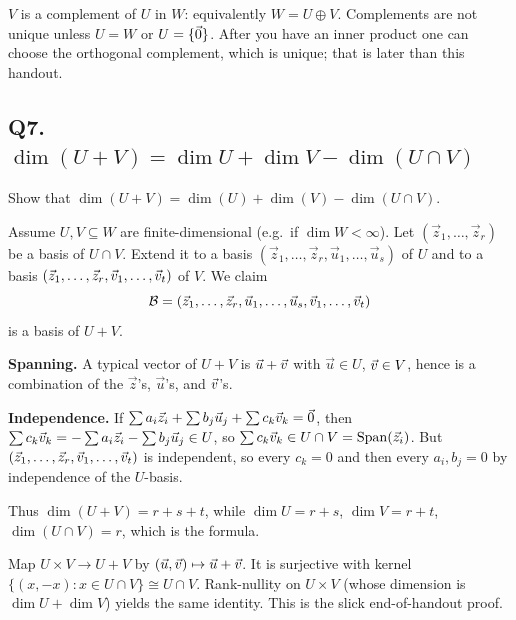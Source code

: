\begin{laterbox}
$V$ is a complement of $U$ in $W$: equivalently $W=U\oplus V$. Complements are
not unique unless $U=W$ or $U=\{\vec{0}\}$. After you have an inner product one
can choose the orthogonal complement, which is unique; that is later than this
handout.
\end{laterbox}

\subsection{Q7. $\dim(U+V)=\dim U+\dim V-\dim(U\cap V)$}

\begin{promptbox}
Show that $\dim(U+V)=\dim(U)+\dim(V)-\dim(U\cap V)$.
\end{promptbox}

\begin{coursebox}
Assume $U,V\subseteq W$ are finite-dimensional (e.g.\ if $\dim W<\infty$).
Let $(\vec{z}_1,\ldots,\vec{z}_r)$ be a basis of $U\cap V$. Extend it to a
basis $(\vec{z}_1,\ldots,\vec{z}_r,\vec{u}_1,\ldots,\vec{u}_s)$ of $U$ and to a
basis $(\vec{z}_1,\ldots,\vec{z}_r,\vec{v}_1,\ldots,\vec{v}_t)$ of $V$. We claim
\[
\mathcal{B}=(\vec{z}_1,\ldots,\vec{z}_r,\vec{u}_1,\ldots,\vec{u}_s,\vec{v}_1,\ldots,\vec{v}_t)
\]
is a basis of $U+V$.

\textbf{Spanning.}
A typical vector of $U+V$ is $\vec{u}+\vec{v}$ with $\vec{u}\in U$, $\vec{v}\in V$,
hence is a combination of the $\vec{z}$'s, $\vec{u}$'s, and $\vec{v}$'s.

\textbf{Independence.}
If $\sum a_i\vec{z}_i+\sum b_j\vec{u}_j+\sum c_k\vec{v}_k=\vec{0}$, then
$\sum c_k\vec{v}_k=-\sum a_i\vec{z}_i-\sum b_j\vec{u}_j\in U$, so
$\sum c_k\vec{v}_k\in U\cap V=\operatorname{Span}(\vec{z}_i)$. But
$(\vec{z}_1,\ldots,\vec{z}_r,\vec{v}_1,\ldots,\vec{v}_t)$ is independent, so every
$c_k=0$ and then every $a_i,b_j=0$ by independence of the $U$-basis.

Thus $\dim(U+V)=r+s+t$, while $\dim U=r+s$, $\dim V=r+t$, $\dim(U\cap V)=r$,
which is the formula.
\end{coursebox}

\begin{laterbox}
Map $U\times V\to U+V$ by $(\vec{u},\vec{v})\mapsto\vec{u}+\vec{v}$. It is surjective
with kernel $\{(x,-x):x\in U\cap V\}\cong U\cap V$. Rank-nullity on $U\times V$
(whose dimension is $\dim U+\dim V$) yields the same identity. This is the
slick end-of-handout proof.
\end{laterbox}
